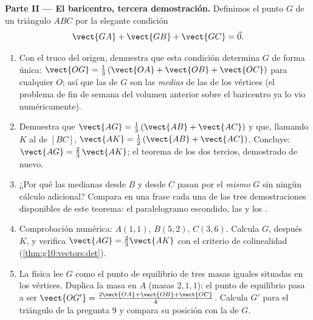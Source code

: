 \begin{problem}
\medskip
\noindent\textbf{Parte II --- El baricentro, tercera demostración.}
Definimos el punto $G$ de un triángulo $ABC$ por la elegante condición
\[
\vect{GA} + \vect{GB} + \vect{GC} = \vec 0 .
\]
\begin{enumerate}[resume]
  \item Con el truco del origen, demuestra que esta condición determina
        $G$ de forma única:
        $\vect{OG} = \frac13\left(\vect{OA} + \vect{OB} +
        \vect{OC}\right)$ para cualquier $O$; así que las  de
        $G$ son las \emph{medias} de las de los vértices (el problema de
        fin de semana del volumen anterior sobre el baricentro ya lo vio
        numéricamente).
  \item Demuestra que $\vect{AG} = \frac13\left(\vect{AB} +
        \vect{AC}\right)$ y que, llamando $K$ al  de $[BC]$,
        $\vect{AK} = \frac12\left(\vect{AB} + \vect{AC}\right)$. Concluye:
        $\vect{AG} = \frac23\,\vect{AK}$; el teorema de los dos tercios,
        demostrado de nuevo.
  \item ¿Por qué las medianas desde $B$ y desde $C$ pasan por el
        \emph{mismo} $G$ sin ningún cálculo adicional? Compara en una
        frase cada una de las tres demostraciones disponibles de este
        teorema: el paralelogramo escondido, las  y los
        .
  \item Comprobación numérica: $A(1, 1)$, $B(5, 2)$, $C(3, 6)$. Calcula
        $G$, después $K$, y verifica $\vect{AG} = \frac23 \vect{AK}$ con
        el criterio de colinealidad (\cref{thm:g10:vectors:det}).
  \item La física lee $G$ como el punto de equilibrio de tres masas
        iguales situadas en los vértices. Duplica la masa en $A$ (masas
        $2, 1, 1$): el punto de equilibrio pasa a ser
        $\vect{OG'} = \frac{2\vect{OA} + \vect{OB} + \vect{OC}}{4}$.
        Calcula $G'$ para el triángulo de la pregunta 9 y compara su
        posición con la de $G$.
\end{enumerate}


\end{problem}

